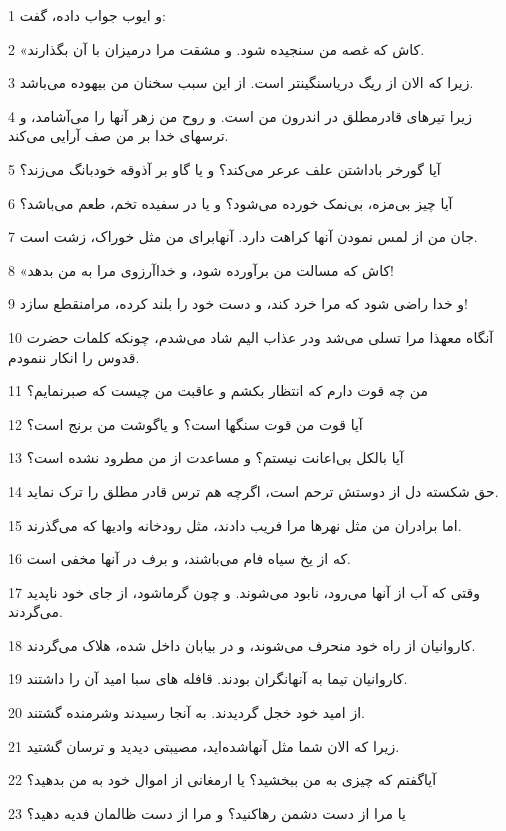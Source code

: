 \par 1 و ایوب جواب داده، گفت:
\par 2 «کاش که غصه من سنجیده شود. و مشقت مرا درمیزان با آن بگذارند.
\par 3 زیرا که الان از ریگ دریاسنگینتر است. از این سبب سخنان من بیهوده می‌باشد.
\par 4 زیرا تیرهای قادرمطلق در اندرون من است. و روح من زهر آنها را می‌آشامد، و ترسهای خدا بر من صف آرایی می‌کند.
\par 5 آیا گورخر باداشتن علف عرعر می‌کند؟ و یا گاو بر آذوقه خودبانگ می‌زند؟
\par 6 آیا چیز بی‌مزه، بی‌نمک خورده می‌شود؟ و یا در سفیده تخم، طعم می‌باشد؟
\par 7 جان من از لمس نمودن آنها کراهت دارد. آنهابرای من مثل خوراک، زشت است.
\par 8 «کاش که مسالت من برآورده شود، و خداآرزوی مرا به من بدهد!
\par 9 و خدا راضی شود که مرا خرد کند، و دست خود را بلند کرده، مرامنقطع سازد!
\par 10 آنگاه معهذا مرا تسلی می‌شد ودر عذاب الیم شاد می‌شدم، چونکه کلمات حضرت قدوس را انکار ننمودم.
\par 11 من چه قوت دارم که انتظار بکشم و عاقبت من چیست که صبرنمایم؟
\par 12 آیا قوت من قوت سنگها است؟ و یاگوشت من برنج است؟
\par 13 آیا بالکل بی‌اعانت نیستم؟ و مساعدت از من مطرود نشده است؟
\par 14 حق شکسته دل از دوستش ترحم است، اگر‌چه هم ترس قادر مطلق را ترک نماید.
\par 15 اما برادران من مثل نهرها مرا فریب دادند، مثل رودخانه وادیها که می‌گذرند.
\par 16 که از یخ سیاه فام می‌باشند، و برف در آنها مخفی است.
\par 17 وقتی که آب از آنها می‌رود، نابود می‌شوند. و چون گرماشود، از جای خود ناپدید می‌گردند.
\par 18 کاروانیان از راه خود منحرف می‌شوند، و در بیابان داخل شده، هلاک می‌گردند.
\par 19 کاروانیان تیما به آنهانگران بودند. قافله های سبا امید آن را داشتند.
\par 20 از امید خود خجل گردیدند. به آنجا رسیدند وشرمنده گشتند.
\par 21 زیرا که الان شما مثل آنهاشده‌اید، مصیبتی دیدید و ترسان گشتید.
\par 22 آیاگفتم که چیزی به من ببخشید؟ یا ارمغانی از اموال خود به من بدهید؟
\par 23 یا مرا از دست دشمن رهاکنید؟ و مرا از دست ظالمان فدیه دهید؟
